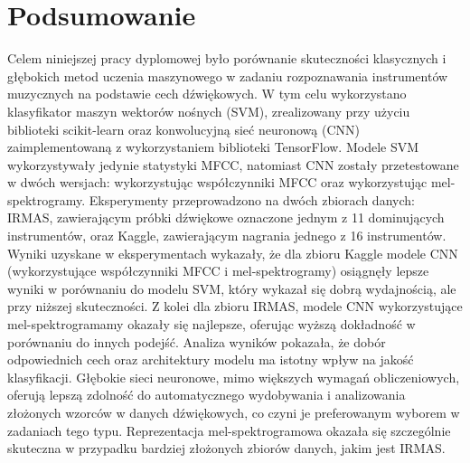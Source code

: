\documentclass{SGGW-thesis}
\begin{document}
\chapter{Podsumowanie}
Celem niniejszej pracy dyplomowej było porównanie skuteczności klasycznych i głębokich metod uczenia maszynowego w zadaniu rozpoznawania instrumentów muzycznych na podstawie cech dźwiękowych. W tym celu wykorzystano klasyfikator maszyn wektorów nośnych (SVM), zrealizowany przy użyciu biblioteki scikit-learn oraz konwolucyjną sieć neuronową (CNN) zaimplementowaną z wykorzystaniem biblioteki TensorFlow. Modele SVM wykorzystywały jedynie statystyki MFCC, natomiast CNN zostały przetestowane w dwóch wersjach: wykorzystując współczynniki MFCC oraz wykorzystując mel-spektrogramy. Eksperymenty przeprowadzono na dwóch zbiorach danych: IRMAS, zawierającym próbki dźwiękowe oznaczone jednym z 11 dominujących instrumentów, oraz Kaggle, zawierającym nagrania jednego z 16 instrumentów. Wyniki uzyskane w eksperymentach wykazały, że dla zbioru Kaggle modele CNN (wykorzystujące współczynniki MFCC i mel-spektrogramy) osiągnęły lepsze wyniki w porównaniu do modelu SVM, który wykazał się dobrą wydajnością, ale przy niższej skuteczności. Z kolei dla zbioru IRMAS, modele CNN wykorzystujące mel-spektrogramamy okazały się najlepsze, oferując wyższą dokładność w porównaniu do innych podejść. Analiza wyników pokazała, że dobór odpowiednich cech oraz architektury modelu ma istotny wpływ na jakość klasyfikacji. Głębokie sieci neuronowe, mimo większych wymagań obliczeniowych, oferują lepszą zdolność do automatycznego wydobywania i analizowania złożonych wzorców w danych dźwiękowych, co czyni je preferowanym wyborem w zadaniach tego typu. Reprezentacja mel-spektrogramowa okazała się szczególnie skuteczna w przypadku bardziej złożonych zbiorów danych, jakim jest IRMAS.
\end{document}
